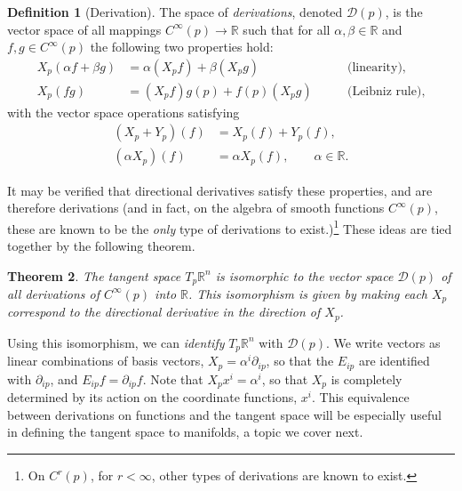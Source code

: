 \documentclass[psamsfonts]{amsart}
\newtheorem{thm}{Theorem}[section]
\theoremstyle{definition}
\newtheorem{defn}[thm]{Definition}
\theoremstyle{remark}
\newcommand*\R{\mathds{R}}
\numberwithin{equation}{section}
\begin{document}
\begin{defn}[Derivation]\label{def:derivations}
The space of \textit{derivations}, denoted $\mathscr{D}(p)$, is the vector space of all mappings $C^{\infty}(p)\rightarrow \R$ such that for all $\alpha, \beta \in \R$ and $f, g \in C^{\infty}(p)$ the following two properties hold:
\begin{equation}\label{eq:linleibniz}
\begin{aligned}
X_p(\alpha f + \beta g) & = {} \alpha (X_p f) + \beta (X_p g) \qquad & \text{(linearity)},\\
X_p(fg) & = {} (X_p f)g(p) + f(p)(X_p g) \qquad & \text{(Leibniz rule)},
\end{aligned}
\end{equation}
with the vector space operations satisfying 
\begin{equation}
\begin{aligned}
(X_p+Y_p)(f) &={} X_p(f) +Y_p(f), \\
(\alpha X_p)(f) &={}\alpha X_p (f), \qquad \alpha \in \R.
 \end{aligned}
 \end{equation}
\end{defn}
It may be verified that directional derivatives satisfy these properties, and are therefore derivations (and in fact, on the algebra of smooth functions $C^{\infty}(p)$, these are known to be the \textit{only} type of derivations to exist.)\footnote{On $C^r(p)$, for $r<\infty$, other types of derivations are known to exist.} These ideas are tied together by the following theorem. 
\begin{thm}
The tangent space $T_p\R^n$ is isomorphic to the vector space $\mathscr{D}(p)$ of all derivations of $C^{\infty}(p)$ into $\R$. This isomorphism is given by making each $X_p$ correspond to the directional derivative in the direction of $X_p$. 
\end{thm}

Using this isomorphism, we can \textit{identify} $T_p\R^n$ with $\mathscr{D}(p)$. We write vectors as linear combinations of basis vectors, $X_p = \alpha^i \partial_{ip}$, so that the $E_{ip}$ are identified with $\partial_{ip}$, and $E_{ip}f = \partial_{ip} f$. Note that $X_p x^i = \alpha^i$, so that $X_p$ is completely determined by its action on the coordinate functions, $x^i$. This equivalence between derivations on functions and the tangent space will be especially useful in defining the tangent space to manifolds, a topic we cover next. 
\end{document}
